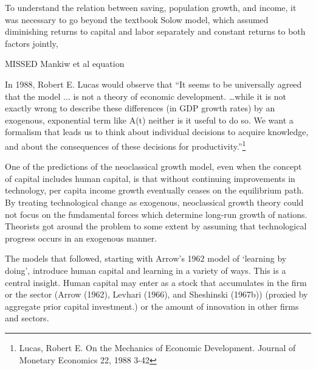 To understand the relation between saving, population growth, and income, it was necessary to go beyond the textbook Solow model, which assumed  diminishing returns to capital and labor separately and constant returns to both factors jointly,


 MISSED Mankiw et al equation 

In 1988, Robert E. Lucas would observe that ``It seems to be universally agreed that the model ... is not a theory of economic development.   \dots while it is not exactly wrong to describe these differences (in GDP  growth rates) by an exogenous, exponential term like A(t) neither is it useful to do so. We want a formalism that leads us to think about individual decisions to acquire knowledge, and about the consequences of these decisions for productivity.''\footnote{Lucas,  Robert E. On the Mechanics of Economic Development. Journal of Monetary Economics 22, 1988 3-42} 




One of the predictions of the neoclassical growth model, even  when the concept of capital includes human capital, is that without  continuing improvements in technology, per capita income growth eventually ceases on the equilibrium path. 
By treating technological change as exogenous, neoclassical growth theory could not focus on the fundamental forces which determine long-run growth of nations. Theorists got around the problem to some extent by assuming that technological progress occurs in an exogenous manner. 

The models that followed, starting with Arrow's  1962 model of `learning by doing', introduce human capital and learning in a variety of ways. This is a central insight. Human capital may enter  as a stock that accumulates in the firm or the sector (Arrow (1962), Levhari (1966), and Sheshinski (1967b)) (proxied by aggregate prior capital investment.)
or the amount of innovation in other firms and sectors. %


